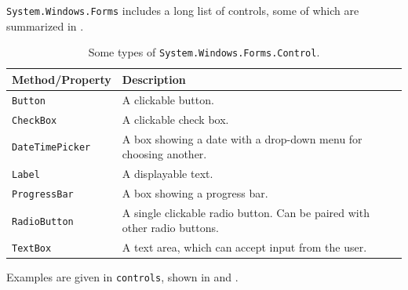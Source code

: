 \documentclass[fsharpnotes.tex]{subfiles}
\begin{document}
\lstinline{System.Windows.Forms} includes a long list of controls, some of which are summarized in .
\begin{table}
  \begin{center}
    \begin{tabularx}{\linewidth}{|l|X|}
      \hline
      \rowcolor{headerRowColor}  Method/Property & Description\\
      \hline
      \lstinline{Button}
      &A clickable button.\\
      \hline
      \lstinline{CheckBox}
      &A clickable check box.\\
      \hline
      \lstinline{DateTimePicker}
      &A box showing a date with a drop-down menu for choosing another.\\
      \hline
      \lstinline{Label}
      &A displayable text.\\
      \hline
      \lstinline{ProgressBar}
      &A box showing a progress bar.\\
      \hline
      \lstinline{RadioButton}
      &A single clickable radio button. Can be paired with other radio buttons.\\
      \hline
      \lstinline{TextBox}
      &A text area, which can accept input from the user.\\
      \hline
    \end{tabularx}
  \end{center}
  \caption{Some types of \lstinline{System.Windows.Forms.Control}.}
  \label{tab:controls}
\end{table}
Examples are given in \lstinline{controls}, shown in  and .
%
%
\end{document}
